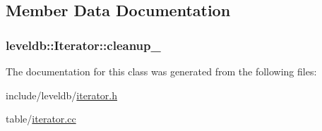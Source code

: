 \subsection{Member Data Documentation}
\hypertarget{classleveldb_1_1_iterator_aa65451661a270eab5db682d4e4a01773}{}
\subsubsection[{cleanup\+\_\+}]{ leveldb\+::\+Iterator\+::cleanup\+\_\+\hspace{0.3cm}{\ttfamily [private]}}\label{classleveldb_1_1_iterator_aa65451661a270eab5db682d4e4a01773}


The documentation for this class was generated from the following files\+:\begin{DoxyCompactItemize}
\item 
include/leveldb/\hyperlink{iterator_8h}{iterator.\+h}\item 
table/\hyperlink{iterator_8cc}{iterator.\+cc}\end{DoxyCompactItemize}

